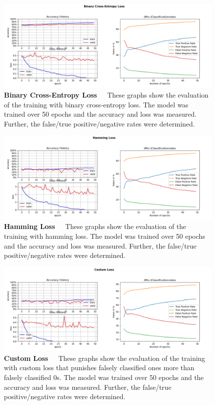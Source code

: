 \begin{figure}[!htb]
	\centering
	\includegraphics[scale=0.37]{Figures/chapter04/multilabel_crossentropy.png}
	\decoRule
	\caption[Multi-Label Binary Cross-Entropy Loss]{\textbf{Binary Cross-Entropy Loss}~~~These graphs show the evaluation of the training with binary cross-entropy loss. The model was trained over 50 epochs and the accuracy and loss was measured. Further, the false/true positive/negative rates were determined.}
	\label{fig:MultilabelCrossentropy}
\end{figure}

\begin{figure}[!htb]
	\centering
	\includegraphics[scale=0.37]{Figures/chapter04/multilabel_hamming.png}
	\decoRule
	\caption[Multi-Label Hamming Loss]{\textbf{Hamming Loss}~~~These graphs show the evaluation of the training with hamming loss. The model was trained over 50 epochs and the accuracy and loss was measured. Further, the false/true positive/negative rates were determined.}
	\label{fig:MultilabelHammingLoss}
\end{figure}

\begin{figure}[!htb]
	\centering
	\includegraphics[scale=0.37]{Figures/chapter04/multilabel_costum.png}
	\decoRule
	\caption[Multi-Label Custom Loss]{\textbf{Custom Loss}~~~These graphs show the evaluation of the training with custom loss that punishes falsely classified ones more than falsely classified 0s. The model was trained over 50 epochs and the accuracy and loss was measured. Further, the false/true positive/negative rates were determined.}
	\label{fig:MultilabelCostumLoss}
\end{figure}

